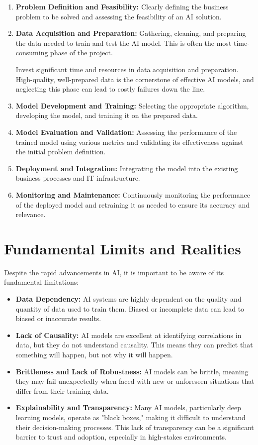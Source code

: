 \begin{enumerate}
    \item \textbf{Problem Definition and Feasibility:} Clearly defining the business problem to be solved and assessing the feasibility of an AI solution.
    \item \textbf{Data Acquisition and Preparation:} Gathering, cleaning, and preparing the data needed to train and test the AI model. This is often the most time-consuming phase of the project.
    \begin{tipbox}
Invest significant time and resources in data acquisition and preparation. High-quality, well-prepared data is the cornerstone of effective AI models, and neglecting this phase can lead to costly failures down the line.
    \end{tipbox}
    \item \textbf{Model Development and Training:} Selecting the appropriate algorithm, developing the model, and training it on the prepared data.
    \item \textbf{Model Evaluation and Validation:} Assessing the performance of the trained model using various metrics and validating its effectiveness against the initial problem definition.
    \item \textbf{Deployment and Integration:} Integrating the model into the existing business processes and IT infrastructure.
    \item \textbf{Monitoring and Maintenance:} Continuously monitoring the performance of the deployed model and retraining it as needed to ensure its accuracy and relevance.
\end{enumerate}

\section{Fundamental Limits and Realities}
\label{sec:fundamental_limits}
Despite the rapid advancements in AI, it is important to be aware of its fundamental limitations:

\begin{itemize}
    \item \textbf{Data Dependency:} AI systems are highly dependent on the quality and quantity of data used to train them. Biased or incomplete data can lead to biased or inaccurate results.
    \item \textbf{Lack of Causality:} AI models are excellent at identifying correlations in data, but they do not understand causality. This means they can predict that something will happen, but not why it will happen.
    \item \textbf{Brittleness and Lack of Robustness:} AI models can be brittle, meaning they may fail unexpectedly when faced with new or unforeseen situations that differ from their training data.
    \item \textbf{Explainability and Transparency:} Many AI models, particularly deep learning models, operate as "black boxes," making it difficult to understand their decision-making processes. This lack of transparency can be a significant barrier to trust and adoption, especially in high-stakes environments.
\end{itemize}


